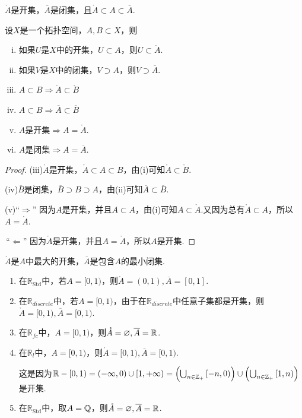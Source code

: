 \begin{note}
    $\mathring{A}$是开集，$\overline{A}$是闭集，且$\mathring{A}\subset A\subset \overline{A}$.
\end{note}

\begin{proposition}[内部与闭包的性质][prop:2.8]
    设$X$是一个拓扑空间，$A,B\subset X$，则
    \begin{enumerate}[(i)]
        \item 如果$U$是$X$中的开集，$U\subset A$，则$U\subset \mathring{A}$.
        \item 如果$V$是$X$中的闭集，$V\supset A$，则$V\supset \overline{A}$.
        \item $A\subset B\Rightarrow \mathring{A}\subset\mathring{B}$
        \item $A\subset B\Rightarrow \overline{A}\subset\overline{B}$
        \item $A$是开集$\Rightarrow A=\mathring{A}$.
        \item $A$是闭集$\Rightarrow A=\overline{A}$.
    \end{enumerate}
\end{proposition}
\begin{proof}
    (iii)$\mathring{A}$是开集，$\mathring{A}\subset A\subset B$，由(i)可知$\mathring{A}\subset\mathring{B}$.\par
    (iv)$\overline{B}$是闭集，$\overline{B}\supset B\supset A$，由(ii)可知$\overline{A}\subset\overline{B}$.\par
    (v)“$\Rightarrow$” 因为$A$是开集，并且$A\subset A$，由(i)可知$A\subset \mathring{A}$.又因为总有$\mathring{A}\subset A$，所以$A=\mathring{A}$.\par
    \quad\,“$\Leftarrow$” 因为$\mathring{A}$是开集，并且$A=\mathring{A}$，所以$A$是开集.
\end{proof}

\begin{note}
    $\mathring{A}$是$A$中最大的开集，$\overline{A}$是包含$A$的最小闭集.
\end{note}

\begin{instance}
    \begin{enumerate}
        \item 在$\mathbb{R}_\mathrm{Std}$中，若$A=[0,1)$，则$\mathring{A}=(0,1),\overline{A}=[0,1]$.
        \item 在$\mathbb{R}_{discrete}$中，若$A=[0,1)$，由于在$\mathbb{R}_{discrete}$中任意子集都是开集，则$\mathring{A}=[0,1),\overline{A}=[0,1)$.
        \item 在$\mathbb{R}_{fc}$中，$A=[0,1)$，则$\mathring{A}=\varnothing,\overline{A}=\mathbb{R}$.
        \item 在$\mathbb{R}_l$中，$A=[0,1)$，则$\mathring{A}=[0,1),\overline{A}=[0,1)$.\par
        这是因为$\mathbb{R}-[0,1)=(-\infty,0)\cup [1,+\infty)=\left(\bigcup_{n\in\mathbb{Z}_+}{[-n,0)}\right)\cup \left(\bigcup_{n\in\mathbb{Z_+}}{[1,n)}\right)$是开集.
        \item 在$\mathbb{R}_\mathrm{Std}$中，取$A=\mathbb{Q}$，则$\mathring{A}=\varnothing,\overline{A}=\mathbb{R}$.
    \end{enumerate}
\end{instance}


